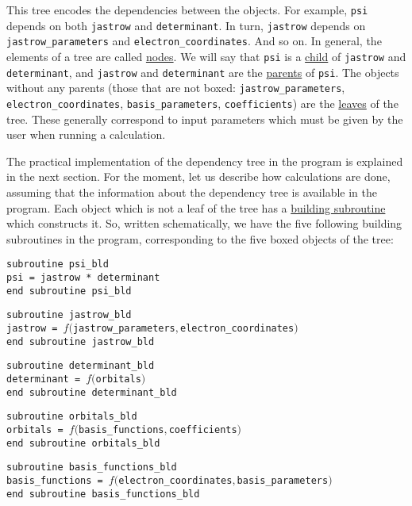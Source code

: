 \documentclass[letter,11pt]{article}
\newcommand\Def[1]{\underline{#1}}
\begin{document}
This tree encodes the dependencies between the objects.
For example, {\tt psi} depends on both {\tt jastrow} and {\tt determinant}.
In turn, {\tt jastrow} depends on {\tt jastrow_parameters} and {\tt electron_coordinates}. And so on.
In general, the elements of a tree are called \Def{nodes}.
We will say that {\tt psi} is a \Def{child} of {\tt jastrow} and {\tt determinant},
and {\tt jastrow} and {\tt determinant} are the \Def{parents} of {\tt psi}.
The objects without any parents (those that are not boxed: {\tt jastrow_parameters}, {\tt electron_coordinates}, {\tt basis_parameters}, {\tt coefficients}) are the \Def{leaves} of the tree.
These generally correspond to input parameters which must be given by the user when running a calculation.

\vspace{1em}
The practical implementation of the dependency tree in the program is explained in the next section. For the moment, let us describe how calculations are done, assuming that the information about the dependency tree is available in the program.
Each object which is not a leaf of the tree has a \Def{building subroutine} which constructs it. So, written schematically, we have the five following building subroutines in the program, corresponding to the five boxed objects of the tree:

\vspace{0.5cm}
\noindent
{\tt subroutine psi_bld\\
psi = jastrow * determinant\\
end subroutine psi_bld}

\vspace{0.5cm}
\noindent
{\tt subroutine jastrow_bld\\
jastrow  = $f(${\tt jastrow_parameters}$,${\tt electron_coordinates}$)$\\
end subroutine jastrow_bld}

\vspace{0.5cm}
\noindent
{\tt subroutine determinant_bld\\
determinant  = $f(${\tt orbitals}$)$\\
end subroutine determinant_bld}

\vspace{0.5cm}
\noindent
{\tt subroutine orbitals_bld\\
orbitals  = $f(${\tt basis_functions}$,${\tt coefficients}$)$\\
end subroutine orbitals_bld}

\vspace{0.5cm}
\noindent
{\tt subroutine basis_functions_bld\\
basis_functions  = $f(${\tt electron_coordinates}$,${\tt basis_parameters}$)$\\
end subroutine basis_functions_bld}
\end{document}
